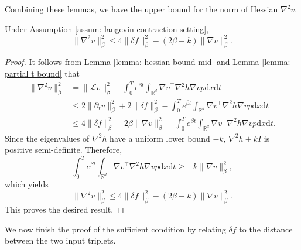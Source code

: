 \documentclass[twoside,11pt]{article}
\newcommand{\dd}{\mathrm{d}}
\newcommand{\R}{\mathbb{R}}
\newcommand{\1}{\mathbf{1}}
\newcommand{\cL}{\mathcal{L}}
\numberwithin{equation}{section}
\begin{document}
Combining these lemmas, we have the upper bound for the norm of Hessian $ \nabla^2 v$.
\begin{theorem}\label{thm: hessian bound}
    Under Assumption \ref{assum: langevin contraction setting},
    \begin{equation}
        \|\nabla^2 v\|_{\beta}^2 \le 4\|\delta f\|_{\beta}^2 - (2\beta - k)\|\nabla v\|_{\beta}^2.
    \end{equation}
\end{theorem}
\begin{proof}
    It follows from Lemma \ref{lemma: hessian bound mid} and Lemma \ref{lemma: partial t bound} that
    \begin{equation}
    \begin{aligned}
        \|\nabla^2 v\|_{\beta}^2 &= \|\cL v\|_{\beta}^2 - \int_{0}^T e^{\beta t} \int_{\R^d} \nabla v^{\top} \nabla^2 h\nabla v p \dd x \dd t \\
        &\le 2\|\partial_t v\|_{\beta}^2 + 2\|\delta f\|_{\beta}^2 - \int_{0}^T e^{\beta t} \int_{\R^d} \nabla v^{\top} \nabla^2 h\nabla v p \dd x \dd t\\
        &\le 4\|\delta f\|_{\beta}^2 - 2\beta \|\nabla v\|_{\beta}^2- \int_{0}^T e^{\beta t} \int_{\R^d} \nabla v^{\top} \nabla^2 h\nabla v p \dd x \dd t.
        \end{aligned}
    \end{equation}
    Since the eigenvalues of $ \nabla^2 h$ have a uniform lower bound $ -k$, $ \nabla^2 h + kI$ is positive semi-definite. Therefore, $$ \int_{0}^T e^{\beta t}\int_{\R^d} \nabla v^{\top} \nabla^2 h\nabla v p \dd x \dd t \ge -k \|\nabla v\|_{\beta}^2,$$
    which yields
    \begin{equation}
        \|\nabla^2 v\|_{\beta}^2 \le 4\|\delta f\|_{\beta}^2 - (2\beta - k) \|\nabla v\|_{\beta}^2.
    \end{equation}
    This proves the desired result.
\end{proof}


We now finish the proof of the sufficient condition by relating $\delta f$ to the distance between the two input triplets.
\end{document}
